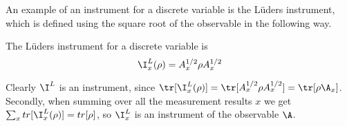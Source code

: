 An example of an instrument for a discrete variable is the Lüders instrument, which is defined using the square root of the observable in the following way.

\begin{definition}
The Lüders instrument for a discrete variable is 
\begin{equation}
\I_x^L(\rho) = A_x^{1/2}\rho A_x^{1/2}
\end{equation}
\end{definition}
Clearly $\I^L$ is an instrument, since $\tr[\I_x^L(\rho)] = \tr[A_x^{1/2}\rho A_x^{1/2}] = \tr[\rho \A_x]$. Secondly, when summing over all the measurement results $x$ we get $\sum_x tr[\I_x^L(\rho)] = tr[\rho]$, so $\I_x^L$ is an instrument of the observable $\A$.


